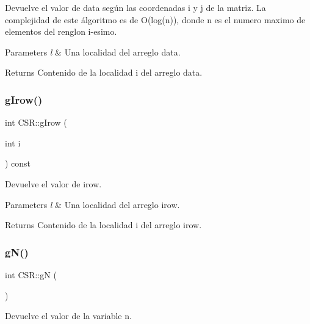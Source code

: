 Devuelve el valor de data según las coordenadas i y j de la matriz. La complejidad de este álgoritmo es de O(log(n)), donde n es el numero maximo de elementos del renglon i-\/esimo. 


\begin{DoxyParams}{Parameters}
{\em l} & Una localidad del arreglo data. \\
\hline
\end{DoxyParams}
\begin{DoxyReturn}{Returns}
Contenido de la localidad i del arreglo data. 
\end{DoxyReturn}
\hypertarget{class_c_s_r_ae340935fa14b4c13e8a25ab490853ba7}{}\label{class_c_s_r_ae340935fa14b4c13e8a25ab490853ba7} 
\subsubsection{\texorpdfstring{g\+Irow()}{gIrow()}}
{\footnotesize\ttfamily int C\+S\+R\+::g\+Irow (\begin{DoxyParamCaption}\item[{int}]{i }\end{DoxyParamCaption}) const\hspace{0.3cm}{\ttfamily [inline]}}



Devuelve el valor de irow. 


\begin{DoxyParams}{Parameters}
{\em l} & Una localidad del arreglo irow. \\
\hline
\end{DoxyParams}
\begin{DoxyReturn}{Returns}
Contenido de la localidad i del arreglo irow. 
\end{DoxyReturn}
\hypertarget{class_c_s_r_aa32f7bdefbbc779fdc8752b4059cd277}{}\label{class_c_s_r_aa32f7bdefbbc779fdc8752b4059cd277} 
\subsubsection{\texorpdfstring{g\+N()}{gN()}}
{\footnotesize\ttfamily int C\+S\+R\+::gN (\begin{DoxyParamCaption}{ }\end{DoxyParamCaption})\hspace{0.3cm}{\ttfamily [inline]}}



Devuelve el valor de la variable n. 


